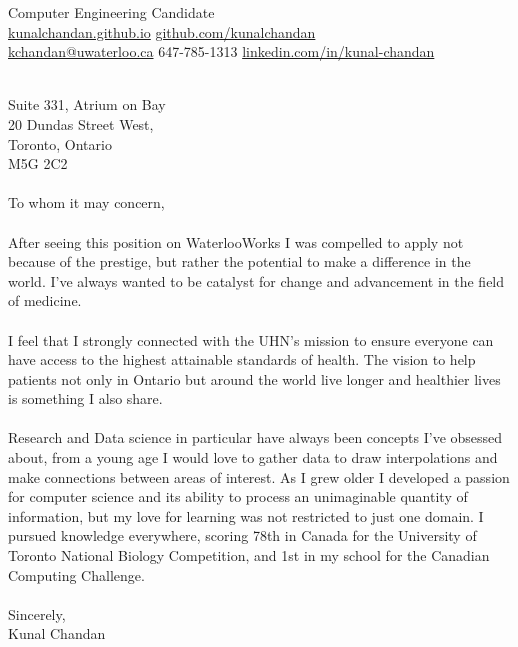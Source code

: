 \documentclass[]{chandan-cv}
\begin{document}
%
%

%
%
{ 
Computer Engineering Candidate \\
\href{http://kunalchandan.github.io}{kunalchandan.github.io}
\hfill
\href{http://github.com/kunalchandan}{github.com/kunalchandan}\\
\href{mailto:kchandan@uwaterloo.ca}{kchandan@uwaterloo.ca}
\hfill
647-785-1313
\hfill 
\href{https://www.linkedin.com/in/kunal-chandan/}{linkedin.com/in/kunal-chandan}
}
\begin{minipage}[t]{0.2\textwidth}
\end{minipage}
\begin{minipage}[t]{0.8\textwidth}
\\
\vspace{50}
\large
Suite 331, Atrium on Bay\\
20 Dundas Street West,\\
Toronto, Ontario\\
M5G 2C2\\
\\
To whom it may concern,\\
\\
After seeing this position on WaterlooWorks I was compelled to apply not because of the prestige, but rather the potential to make a difference in the world. I’ve always wanted to be catalyst for change and advancement in the field of medicine.\\
\\
I feel that I strongly connected with the UHN’s mission to ensure everyone can have access to the highest attainable standards of health. The vision to help patients not only in Ontario but around the world live longer and healthier lives is something I also share.\\
\\
Research and Data science in particular have always been concepts I’ve obsessed about, from a young age I would love to gather data to draw interpolations and make connections between areas of interest. As I grew older I developed a passion for computer science and its ability to process an unimaginable quantity of information, but my love for learning was not restricted to just one domain. I pursued knowledge everywhere, scoring 78th in Canada for the University of Toronto National Biology Competition, and 1st in my school for the Canadian Computing Challenge.\\
\\
Sincerely,\\
Kunal Chandan\\
\\
\end{minipage}
\end{document}
